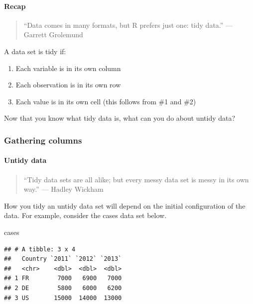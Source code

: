 \documentclass[
]{article}
\newenvironment{Shaded}{\begin{snugshade}}{\end{snugshade}}
\newcommand{\NormalTok}[1]{#1}
\providecommand{\tightlist}{%
  \setlength{\itemsep}{0pt}\setlength{\parskip}{0pt}}
\begin{document}
\hypertarget{recap-9}{%
\paragraph{Recap}\label{recap-9}}

\begin{quote}
``Data comes in many formats, but R prefers just one: tidy data.'' ---
Garrett Grolemund
\end{quote}

A data set is tidy if:

\begin{enumerate}
\def\labelenumi{\arabic{enumi}.}
\tightlist
\item
  Each variable is in its own column
\item
  Each observation is in its own row
\item
  Each value is in its own cell (this follows from \#1 and \#2)
\end{enumerate}

Now that you know what tidy data is, what can you do about untidy data?

\hypertarget{gathering-columns}{%
\subsubsection{Gathering columns}\label{gathering-columns}}

\hypertarget{untidy-data}{%
\paragraph{Untidy data}\label{untidy-data}}

\begin{quote}
``Tidy data sets are all alike; but every messy data set is messy in its
own way.'' --- Hadley Wickham
\end{quote}

How you tidy an untidy data set will depend on the initial configuration
of the data. For example, consider the cases data set below.

\begin{Shaded}
\begin{Highlighting}[]
\NormalTok{cases}
\end{Highlighting}
\end{Shaded}

\begin{verbatim}
## # A tibble: 3 x 4
##   Country `2011` `2012` `2013`
##   <chr>    <dbl>  <dbl>  <dbl>
## 1 FR        7000   6900   7000
## 2 DE        5800   6000   6200
## 3 US       15000  14000  13000
\end{verbatim}
\end{document}
